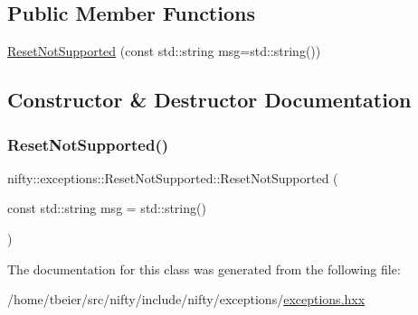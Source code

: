 \subsection*{Public Member Functions}
\begin{DoxyCompactItemize}
\item 
\hyperlink{classnifty_1_1exceptions_1_1ResetNotSupported_aa6fd9fcec97eae36223a45533664f9a9}{Reset\+Not\+Supported} (const std\+::string msg=std\+::string())
\end{DoxyCompactItemize}


\subsection{Constructor \& Destructor Documentation}
\mbox{\label{classnifty_1_1exceptions_1_1ResetNotSupported_aa6fd9fcec97eae36223a45533664f9a9}} 
\subsubsection{\texorpdfstring{Reset\+Not\+Supported()}{ResetNotSupported()}}
{\footnotesize\ttfamily nifty\+::exceptions\+::\+Reset\+Not\+Supported\+::\+Reset\+Not\+Supported (\begin{DoxyParamCaption}\item[{const std\+::string}]{msg = {\ttfamily std\+:\+:string()} }\end{DoxyParamCaption})\hspace{0.3cm}{\ttfamily [inline]}}



The documentation for this class was generated from the following file\+:\begin{DoxyCompactItemize}
\item 
/home/tbeier/src/nifty/include/nifty/exceptions/\hyperlink{exceptions_8hxx}{exceptions.\+hxx}\end{DoxyCompactItemize}
